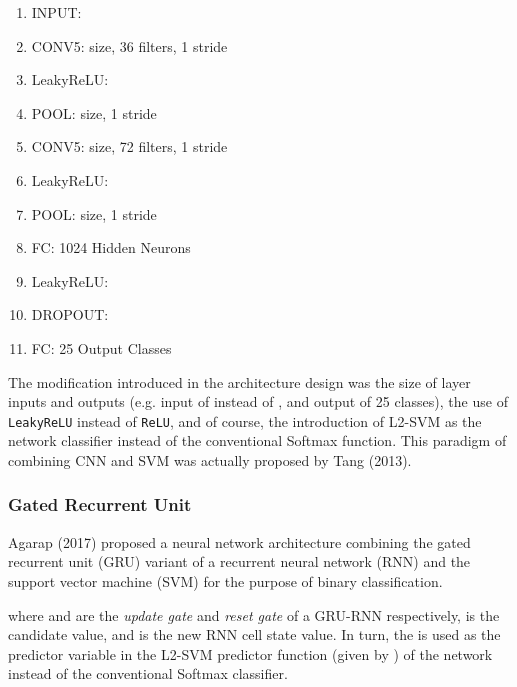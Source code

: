 \documentclass[sigconf]{acmart}
\begin{document}
\begin{enumerate}
\item INPUT: 
\item {\color{green}CONV5:  size, 36 filters, 1 stride}
\item {\color{red}LeakyReLU: }
\item {\color{blue}POOL:  size, 1 stride}
\item {\color{green}CONV5:  size, 72 filters, 1 stride}
\item {\color{red}LeakyReLU: }
\item {\color{blue}POOL:  size, 1 stride}
\item {\color{orange}FC: 1024 Hidden Neurons}
\item {\color{red}LeakyReLU: }
\item {\color{purple}DROPOUT: }
\item {\color{orange}FC: 25 Output Classes}
\end{enumerate}

The modification introduced in the architecture design was the size of layer inputs and outputs (e.g. input of  instead of , and output of 25 classes), the use of \texttt{LeakyReLU} instead of \texttt{ReLU}, and of course, the introduction of L2-SVM as the network classifier instead of the conventional Softmax function. This paradigm of combining CNN and SVM was actually proposed by Tang (2013)\cite{tang2013deep}.

\subsubsection{Gated Recurrent Unit}\label{gru}
Agarap (2017)\cite{agarap2017neural} proposed a neural network architecture combining the gated recurrent unit (GRU)\cite{Cho} variant of a recurrent neural network (RNN) and the support vector machine (SVM)\cite{Cortes} for the purpose of binary classification.





where  and  are the \textit{update gate} and \textit{reset gate} of a GRU-RNN respectively,  is the candidate value, and  is the new RNN cell state value\cite{Cho}. In turn, the  is used as the predictor variable  in the L2-SVM predictor function (given by ) of the network instead of the conventional Softmax classifier.
\end{document}
